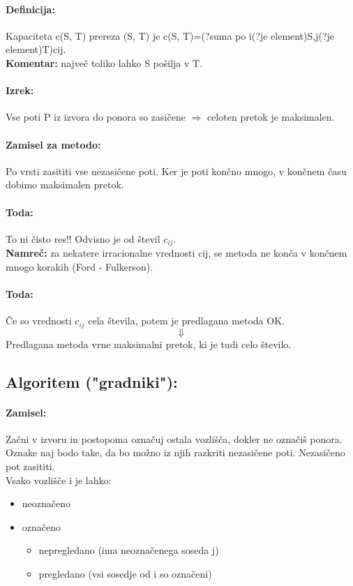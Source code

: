 \documentclass[a4paper,10pt]{article}
\begin{document}
\paragraph{Definicija:}
Kapaciteta c(S, T) prereza (S, T) je c(S, T)=(?suma po i(?je element)S,j(?je element)T)cij.\\
\textbf{Komentar:} najve\v c toliko lahko S po\v silja v T.

\paragraph{Izrek:}
Vse poti P iz izvora do ponora so zasi\v cene $\Rightarrow$ celoten pretok je maksimalen.\\

\paragraph{Zamisel za metodo:}
Po vrsti zasititi vse nezasi\v cene poti. Ker je poti kon\v cno mnogo, v kon\v cnem \v casu dobimo maksimalen pretok.

\paragraph{Toda:}
To ni \v cisto res!! Odvisno je od \v stevil $c_{ij}$.\\
\textbf{Namre\v c:} za nekatere irracionalne vrednosti cij, se metoda ne kon\v ca v kon\v cnem mnogo korakih (Ford - Fulkerson).

\paragraph{Toda:}
\v Ce so vrednosti $c_{ij}$ cela \v stevila, potem je predlagana metoda OK.
$$\Downarrow$$
Predlagana metoda vrne maksimalni pretok, ki je tudi celo \v stevilo.

\subsection{Algoritem ("gradniki"):}

\paragraph{Zamisel:}
Za\v cni v izvoru in postopoma ozna\v cuj ostala vozli\v s\v ca, dokler ne ozna\v ci\v s ponora.
Oznake naj bodo take, da bo mo\v zno iz njih razkriti nezasi\v cene poti.
Nezasi\v ceno pot zasititi.\\
Vsako vozli\v s\v ce i je lahko:
\begin{itemize}
\item neozna\v ceno
\item ozna\v ceno
	\begin{itemize}
	\item nepregledano (ima neozna\v cenega soseda j)
	\item pregledano (vsi sosedje od i so ozna\v ceni)
	
	\end{itemize}
\end{itemize}
\end{document}
